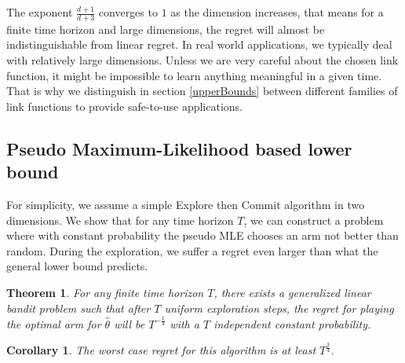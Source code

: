 \documentclass[twoside]{article} \usepackage{aistats2017}
\newtheorem{theorem}{Theorem}
\newtheorem{corollary}{Corollary}[theorem]
\begin{document}
The exponent $\frac{d+1}{d+3}$ converges to $1$ as the dimension increases, that means for a finite time horizon and large dimensions, the regret will almost be indistinguishable from linear regret. 
In real world applications, we typically deal with relatively large dimensions. 
Unless we are very careful about the chosen link function, it might be impossible to learn anything meaningful in a given time.
That is why we distinguish in section \ref{upperBounds} between different families of link functions to provide safe-to-use applications.

\subsection{Pseudo Maximum-Likelihood based lower bound}
For simplicity, we assume a simple Explore then Commit algorithm in two dimensions. 
We show that for any time horizon $T$, we can construct a problem where with constant probability the pseudo MLE chooses an arm not better than random.
During the exploration, we suffer a regret even larger than what the general lower bound predicts.
\begin{theorem}
For any finite time horizon $T$, there exists a generalized linear bandit problem such that after $T$ uniform exploration steps, the regret for playing the optimal arm for $\hat{\theta}$ will be $T^{-\frac{1}{4}}$ with a $T$ independent constant probability.
\end{theorem}
\begin{corollary}
The worst case regret for this algorithm is at least $T^{\frac{3}{4}}$.
\end{corollary}
\end{document}
